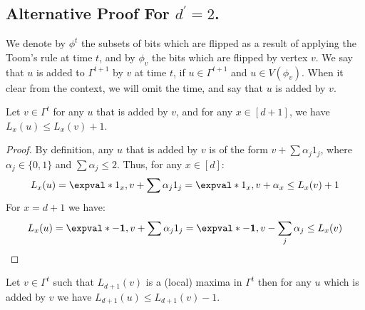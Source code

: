 \subsection{Alternative Proof For $d^{\prime} = 2$.}

\begin{definition}
We denote by $\phi^{t}$ the subsets of bits which are flipped as a result of applying the Toom's rule at time $t$, and by $\phi_{v}$ the bits which are flipped by vertex $v$. We say that $u$ is added to $\Gamma^{t+1}$ by $v$ at time $t$, if $u\in \Gamma^{t+1}$ and $u \in V(\phi_{v})$. When it clear from the context, we will omit the time, and say that $u$ is added by $v$. 
\end{definition}


\begin{claim}
  \label{claim:toombound}
Let $v \in \Gamma^{t}$ for any $u$ that is added by $v$, and for any $x \in [d+1]$, we have $L_{x}(u) \le L_{x}(v) + 1$.
\end{claim}
\begin{proof}
By definition, any $u$ that is added by $v$ is of the form $v + \sum \alpha_{j}1_{j}$, where $\alpha_{j} \in \{0,1\}$ and $\sum \alpha_j \le 2$. Thus, for any $x \in [d]$:
  \begin{equation*}
    \begin{split}
      L_{x}(u) = \expval*{1_{x}, v + \sum \alpha_{j}1_{j}} = \expval*{1_{x},v} +\alpha_{x} \le L_{x}(v) + 1 
    \end{split}
  \end{equation*}
For $x = d+1$ we have: 
  \begin{equation*}
    \begin{split}
      L_{x}(u) = \expval*{-\mathbf{1}, v + \sum \alpha_{j}1_{j}} = \expval*{-\mathbf{1},v} - \sum_{j}\alpha_{j} \le L_{x}(v) 
    \end{split}
  \end{equation*}
\end{proof}
\begin{claim}
  \label{claim:toomb}
  Let $v \in \Gamma^{t}$ such that $L_{d+1}(v)$ is a (local) maxima in $\Gamma^{t}$ then for any $u$ which is added by $v$ we have $L_{d+1}(u) \le L_{d+1}(v) - 1$. 
\end{claim}

